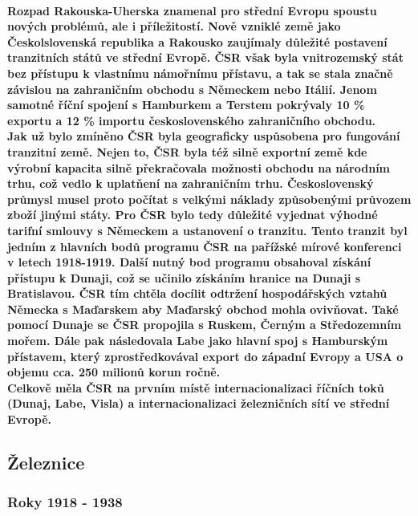 \documentclass{article}
\begin{document}
\paragraph{\quad Rozpad Rakouska-Uherska znamenal pro střední Evropu spoustu nových problémů, ale i příležitostí. Nově vzniklé země jako Českolslovenská republika a Rakousko zaujímaly důležité postavení tranzitních států ve střední Evropě. ČSR však byla vnitrozemský stát bez přístupu k vlastnímu námořnímu přístavu, a tak se stala značně závislou na zahraničním obchodu s Německem nebo Itálií. Jenom samotné říční spojení s Hamburkem a Terstem pokrývaly 10 \% exportu a 12 \% importu československého zahraničního obchodu.
\\\indent Jak už bylo zmíněno ČSR byla geograficky uspůsobena pro  fungování tranzitní země. Nejen to, ČSR byla též silně exportní země kde výrobní kapacita silně překračovala možnosti obchodu na národním trhu, což vedlo k uplatňení na zahraničním trhu. Československý průmysl musel proto počítat s velkými náklady způsobenými průvozem zboží jinými státy. Pro ČSR bylo tedy důležité vyjednat výhodné tarifní smlouvy s Německem a ustanovení o tranzitu. Tento tranzit byl jedním z hlavních bodů programu ČSR na pařížské mírové konferenci v letech 1918-1919. Další nutný bod programu obsahoval získání přístupu k Dunaji, což se učinilo získáním hranice na Dunaji s Bratislavou. ČSR tím chtěla docílit odtržení hospodářských vztahů Německa s Maďarskem aby Maďarský obchod mohla ovivňovat. Také pomocí Dunaje se ČSR propojila s Ruskem, Černým a Středozemním mořem. Dále pak následovala Labe jako hlavní spoj s Hamburským přístavem, který zprostředkovával export do západní Evropy a USA o objemu cca. 250 milionů korun ročně.
\\\indent Celkově měla ČSR na prvním místě internacionalizaci říčních toků (Dunaj, Labe, Visla) a internacionalizaci železničních sítí ve střední Evropě.  }

\subsection{Železnice}

\subsubsection{Roky 1918 - 1938}
\end{document}
